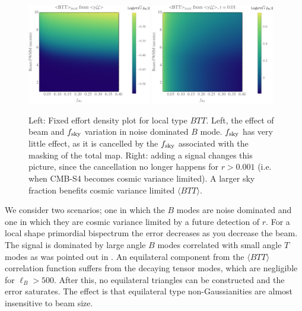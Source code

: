 \begin{figure}[htbp!]
\centering
\includegraphics[width=0.48\textwidth]{Inflation/FixedEffortBTTlocal}
\includegraphics[width=0.48\textwidth]{Inflation/FixedEffortBTTlocalr}
\caption{Left: Fixed effort density plot for local type $BTT$. Left, the effect of beam and $f_{\rm sky}$ variation in noise dominated $B$ mode. $f_{\rm sky}$ has very little effect, as it is cancelled by the $f_{\rm sky}$ associated with the masking of the total map. Right: adding a signal changes this picture, since the cancellation no longer happens for $r > 0.001$ (i.e. when CMB-S4 becomes cosmic variance limited). A larger sky fraction benefits cosmic variance limited $\langle BTT\rangle$. }
\label{fig_BTTlocalfixedeffort}
\end{figure}




We consider two scenarios; one in which the $B$ modes are noise dominated and one in which they are cosmic variance limited by a future detection of $r$. For a local shape primordial bispectrum the error decreases as you decrease the beam. The signal is dominated by large angle $B$ modes correlated with small angle $T$ modes as was pointed out in \cite{Meerburg2016}. An equilateral component from the $\langle BTT\rangle$ correlation function suffers from the decaying tensor modes, which are negligible for $\ell_B > 500$. After this, no equilateral triangles can be constructed and the error saturates. The effect is that equilateral type non-Gaussianities are almost insensitive to beam size. 


